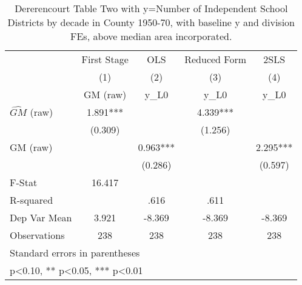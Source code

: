 \begin{table}[htbp]\centering
\def\sym#1{\ifmmode^{#1}\else\(^{#1}\)\fi}
\caption{Dererencourt Table Two with y=Number of Independent School Districts by decade in County 1950-70, with baseline y and division FEs, above median area incorporated.}
\begin{tabular}{l*{4}{c}}
\toprule
                    & First Stage   &         OLS   &Reduced Form   &        2SLS   \\
                    &\multicolumn{1}{c}{(1)}&\multicolumn{1}{c}{(2)}&\multicolumn{1}{c}{(3)}&\multicolumn{1}{c}{(4)}\\
                    &\multicolumn{1}{c}{GM  (raw)}&\multicolumn{1}{c}{y\_L0}&\multicolumn{1}{c}{y\_L0}&\multicolumn{1}{c}{y\_L0}\\
\midrule
$\hat{GM}$ (raw)    &       1.891***&               &       4.339***&               \\
                    &     (0.309)   &               &     (1.256)   &               \\
\addlinespace
GM  (raw)           &               &       0.963***&               &       2.295***\\
                    &               &     (0.286)   &               &     (0.597)   \\
\midrule
F-Stat              &      16.417   &               &               &               \\
R-squared           &               &        .616   &        .611   &               \\
Dep Var Mean        &       3.921   &      -8.369   &      -8.369   &      -8.369   \\
Observations        &         238   &         238   &         238   &         238   \\
\bottomrule
\multicolumn{5}{l}{\footnotesize Standard errors in parentheses}\\
\multicolumn{5}{l}{\footnotesize * p<0.10, ** p<0.05, *** p<0.01}\\
\end{tabular}
\end{table}

